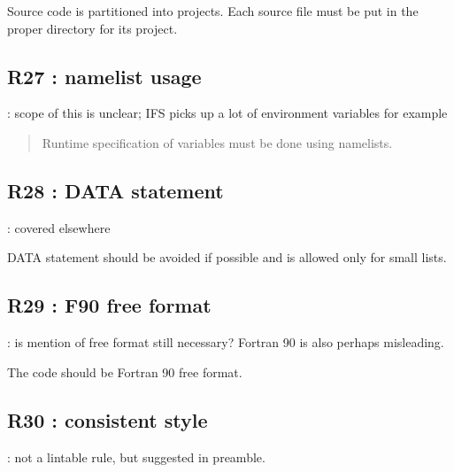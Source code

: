 \documentclass[letterpaper,10pt,english]{sphinxmanual}
\begin{document}
\sphinxAtStartPar
Source code is partitioned into projects.
Each source file must be put in the proper directory for its project.

\sphinxstepscope


\subsection{R27 : namelist usage}
\label{\detokenize{obsolescent/r27:r27-namelist-usage}}\label{\detokenize{obsolescent/r27::doc}}
\sphinxAtStartPar
{} : scope of this is unclear; IFS picks up a lot of environment variables for example
\begin{quote}

\sphinxAtStartPar
Runtime specification of variables must be done using name\sphinxhyphen{}lists.
\end{quote}

\sphinxstepscope


\subsection{R28 :  DATA statement}
\label{\detokenize{obsolescent/r28:r28-data-statement}}\label{\detokenize{obsolescent/r28::doc}}
\sphinxAtStartPar
{} : covered elsewhere

\sphinxAtStartPar
DATA statement should be avoided if possible and is allowed only for small lists.

\sphinxstepscope


\subsection{R29 :  F90 free format}
\label{\detokenize{obsolescent/r29:r29-f90-free-format}}\label{\detokenize{obsolescent/r29::doc}}
\sphinxAtStartPar
{} : is mention of free format still necessary? Fortran 90 is also perhaps misleading.

\sphinxAtStartPar
The code should be Fortran 90 free format.

\sphinxstepscope


\subsection{R30 :  consistent style}
\label{\detokenize{obsolescent/r30:r30-consistent-style}}\label{\detokenize{obsolescent/r30::doc}}
\sphinxAtStartPar
{} : not a lintable rule, but suggested in preamble.
\end{document}
